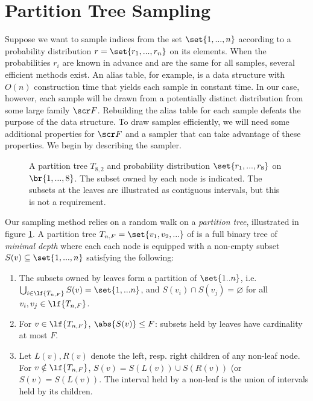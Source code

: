 \section{Partition Tree Sampling}
Suppose we want to sample indices from the set $\set{1, ..., n}$ 
according to a probability 
distribution $r = \set{r_1, ..., r_n}$ on its elements. When the probabilities $r_i$ are known 
in advance and are the same for all samples, several efficient methods exist. 
An alias table, for example, is a data structure with $O(n)$
construction time that yields each sample in constant time.
In our case, however, each sample will be drawn from a potentially 
distinct distribution from some large family $\scr F$. 
Rebuilding the alias table for each sample defeats the purpose 
of the data structure. To draw samples efficiently, we will need 
some additional properties for $\scr F$ and a sampler that can
take advantage of these properties. We begin by describing 
the sampler.

\begin{figure}
    \centering

\scalebox{1.0}{

}
    \caption{A partition tree $T_{8,2}$ and probability distribution $\set{r_1, ..., r_8}$ on 
    $\br{1, ..., 8}$. The subset owned by each node is indicated. 
    The subsets at the leaves are illustrated as contiguous intervals, but this is not a requirement.}
    \label{fig:part_tree}
\end{figure}

Our sampling method relies on a random walk on a 
\textit{partition tree}, illustrated in figure \ref{fig:part_tree}. 
A partition tree $T_{n, F} = \set{v_1, v_2, ...}$ of 
is a full binary tree of 
\textit{minimal depth} where each 
each node is equipped with a non-empty subset $S(v) \subseteq \set{1, ..., n}$ satisfying the following: 

\begin{enumerate}
    \item The subsets owned by leaves form a partition of $\set{1..n}$, i.e. 
    $\bigcup_{i \in \lf{T_{n, F}}} S(v) = \set{1, ... n}$, and $S(v_i) \cap S(v_j) = \varnothing$ for
    all $v_i, v_j \in \lf{T_{n, F}}$.

    \item For $v \in \lf{T_{n, F}}$, $\abs{S(v)} \leq F$: subsets held by leaves have cardinality
    at most $F$.

    \item Let $L(v), R(v)$ denote the left, resp. right children
    of any non-leaf node. For $v \notin \lf{T_{n, F}}$, $S(v) = S(L(v)) \cup S(R(v))$ (or $S(v) = S(L(v))$. The interval held by a non-leaf is the union of intervals held by its children.
\end{enumerate} 

